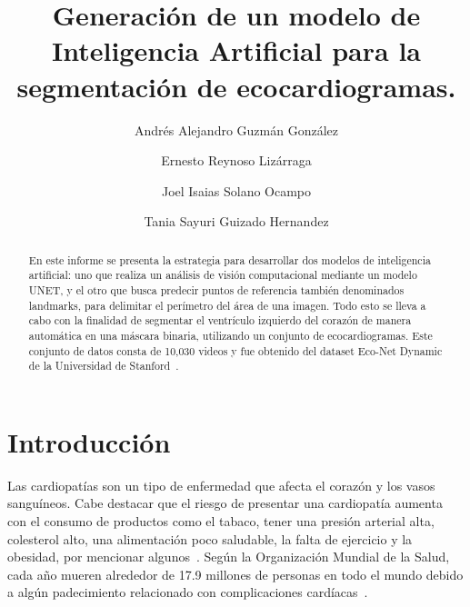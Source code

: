 \documentclass[runningheads]{llncs}
\begin{document}
%
\title{Generación de un modelo de Inteligencia Artificial para la segmentación de ecocardiogramas.}
%
%
\author{Andrés Alejandro Guzmán González  \and
Ernesto Reynoso Lizárraga  \and
Joel Isaias Solano Ocampo  \and
Tania Sayuri Guizado Hernandez }
%
%
%
\maketitle              %
%
\begin{abstract}


En este informe se presenta la estrategia para desarrollar dos modelos de inteligencia artificial: uno que realiza un análisis de visión computacional mediante un modelo UNET, y el otro que busca predecir  puntos de referencia también denominados landmarks, para delimitar el perímetro del área de una imagen. Todo esto se lleva a cabo con la finalidad de segmentar el ventrículo izquierdo del corazón de manera automática en una máscara binaria, utilizando un conjunto de ecocardiogramas. Este conjunto de datos consta de 10,030 videos y fue obtenido del dataset Eco-Net Dynamic de la Universidad de Stanford~\cite{ref_url1}.


\end{abstract}
%
%
%
\section{Introducción}

Las cardiopatías son un tipo de enfermedad que afecta el corazón y los vasos sanguíneos. Cabe destacar que el riesgo de presentar una cardiopatía aumenta con el consumo de productos como el tabaco, tener una presión arterial alta, colesterol alto, una alimentación poco saludable, la falta de ejercicio y la obesidad, por mencionar algunos~\cite{ref_url2}. Según la Organización Mundial de la Salud, cada año mueren alrededor de 17.9 millones de personas en todo el mundo debido a algún padecimiento relacionado con complicaciones cardíacas~\cite{ref_url8}.
\end{document}
